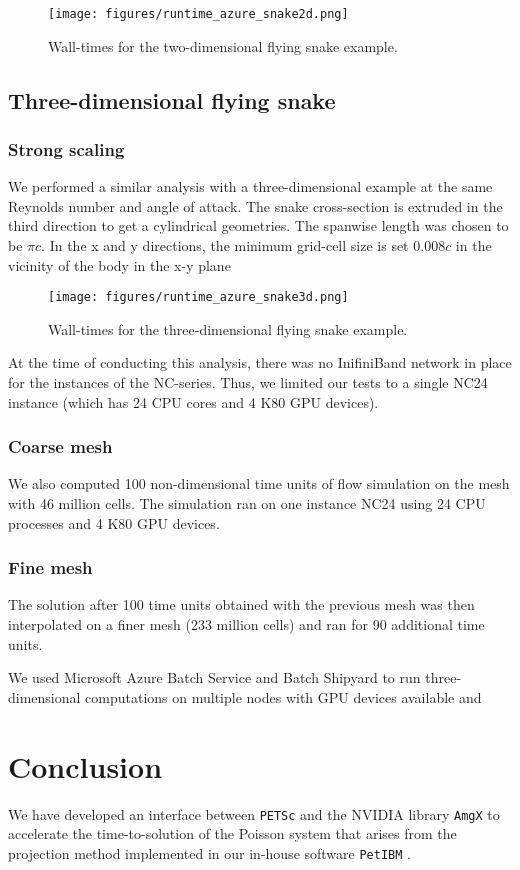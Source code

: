 \documentclass[10pt]{article}
\newcommand{\petibm}{\texttt{PetIBM} }
\newcommand{\petsc}{\texttt{PETSc} }
\newcommand{\amgx}{\texttt{AmgX} }
\begin{document}
\begin{figure}[h!]
\centering
\texttt{[image: figures/runtime\_azure\_snake2d.png]}
\caption{Wall-times for the two-dimensional flying snake example.}
\label{runtime_snake2d_azure}
\end{figure}

\subsection{Three-dimensional flying snake}


\subsubsection{Strong scaling}

We performed a similar analysis with a three-dimensional example at the same Reynolds number and angle of attack.
The snake cross-section is extruded in the third direction to get a cylindrical geometries.
The spanwise length was chosen to be $\pi c$.
In the x and y directions, the minimum grid-cell size is set $0.008c$ in the vicinity of the body  in the x-y plane

\begin{figure}[h!]
\centering
\texttt{[image: figures/runtime\_azure\_snake3d.png]}
\caption{Wall-times for the three-dimensional flying snake example.}
\label{runtime_snake3d_azure}
\end{figure}

At the time of conducting this analysis, there was no InifiniBand network in place for the instances of the NC-series.
Thus, we limited our tests to a single NC24 instance (which has 24 CPU cores and 4 K80 GPU devices).

\subsubsection{Coarse mesh}

We also computed 100 non-dimensional time units of flow simulation on the mesh with 46 million cells.
The simulation ran on one instance NC24 using 24 CPU processes and 4 K80 GPU devices.

\subsubsection{Fine mesh}

The solution after 100 time units obtained with the previous mesh was then interpolated on a finer mesh (233 million cells) and ran for 90 additional time units.

We used Microsoft Azure Batch Service and Batch Shipyard to run three-dimensional computations on multiple nodes with GPU devices available and 

\section{Conclusion}

We have developed an interface between \petsc and the NVIDIA library \amgx to accelerate the time-to-solution of the Poisson system that arises from the projection method implemented in our in-house software \petibm.


\end{document}
